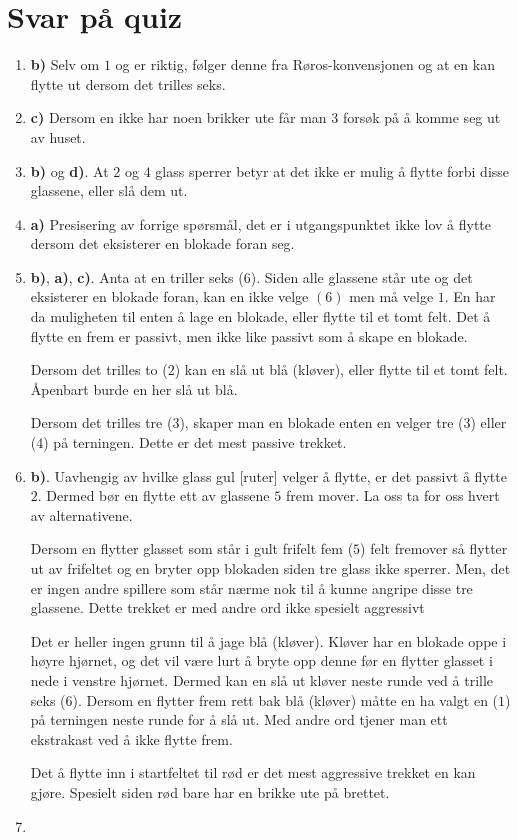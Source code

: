 \documentclass[10pt,a4paper,norsk,openany]{book}
\begin{document}
\section{Svar på quiz}

\begin{enumerate}
  \item \textbf{b)} Selv om $1$ og er riktig, følger denne fra
    Røros-konvensjonen og at en kan flytte ut dersom det trilles seks.
  \item \textbf{c)} Dersom en ikke har noen brikker ute får man $3$ forsøk på
    å komme seg ut av huset.
  \item \textbf{b)} og \textbf{d)}. At $2$ og $4$ glass sperrer betyr at
    det ikke er mulig å flytte forbi disse glassene, eller slå dem ut.
  \item \textbf{a)} Presisering av forrige spørsmål, det er i utgangspunktet
    ikke lov å flytte dersom det eksisterer en blokade foran seg.
  \item \textbf{b)}, \textbf{a)}, \textbf{c)}. Anta at en triller seks ($6$).
    Siden alle glassene står ute og det eksisterer en blokade foran, kan en ikke
    velge $(6)$ men må velge
    $1$. En har da muligheten til enten å lage en blokade, eller flytte til et
    tomt felt. Det å flytte en frem er passivt, men ikke like passivt som å
    skape en blokade.

    Dersom det trilles to ($2$) kan en slå ut blå (kløver), eller flytte til et
    tomt felt. Åpenbart burde en her slå ut blå.

    Dersom det trilles tre ($3$), skaper man en blokade enten en velger tre
    ($3$) eller ($4$) på terningen. Dette er det mest passive trekket.
  \item \textbf{b)}. Uavhengig av hvilke glass gul [ruter] velger å flytte,
    er det passivt å flytte $2$. Dermed bør en flytte ett av glassene $5$
    frem mover. La oss ta for oss hvert av alternativene.

    Dersom en flytter glasset som står i gult frifelt fem ($5$) felt fremover
    så flytter ut av frifeltet og en bryter opp blokaden siden tre
    glass ikke sperrer. Men, det er ingen andre spillere som står nærme nok til
    å kunne angripe disse tre glassene. Dette trekket er med andre ord ikke
    spesielt aggressivt

    Det er heller ingen grunn til å jage blå (kløver). Kløver har en blokade
    oppe i høyre hjørnet, og det vil være lurt å bryte opp denne før en flytter
    glasset i nede i venstre hjørnet. Dermed kan en slå ut kløver neste runde
    ved å trille seks ($6$). Dersom en flytter frem rett bak blå
    (kløver) måtte en ha valgt en ($1$) på terningen neste runde for å slå ut.
    Med andre ord tjener man ett ekstrakast ved å ikke flytte frem.

    Det å flytte inn i startfeltet til rød er det mest aggressive trekket en kan
    gjøre. Spesielt siden rød bare har en brikke ute på brettet.
  \item 
\end{enumerate}
\end{document}
